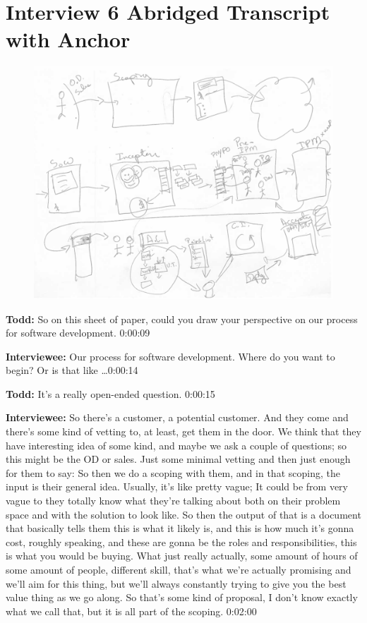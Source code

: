 \section{Interview 6 Abridged Transcript with Anchor }

\begin{figure}[h]
\centering
\includegraphics[width=6.5in]{interviews/drawings/2015_08_12_anchor.png}
\caption{}
\label{2015_08_12_anchor}
\end{figure}

\textbf{Todd:} So on this sheet of paper, could you draw your perspective on our process for software development. 0:00:09

\textbf{Interviewee:}  Our process for software development.  Where do you want to begin?  Or is that like \ldots 0:00:14

\textbf{Todd:} It's a really open-ended question.  0:00:15

\textbf{Interviewee:}  	So there's a customer, a potential customer.  And they come and there's some kind of vetting to, at least, get them in the door.  We think that they have interesting idea of some kind, and maybe we ask a couple of questions; so this might be the OD or sales.  Just some minimal vetting and then just enough for them to say:   So then we do a scoping with them, and in that scoping, the input is their general idea.  Usually, it's like pretty vague; It could be from very vague to they totally know what they're talking about both on their problem space and with the solution to look like.  So then the output of that is a document that basically tells them this is what it likely is, and this is how much it's gonna cost, roughly speaking, and these are gonna be the roles and responsibilities, this is what you would be buying.  What just really actually, some amount of hours of some amount of people, different skill, that's what we're actually promising and we'll aim for this thing, but we'll always constantly trying to give you the best value thing as we go along.  So that's some kind of proposal, I don't know exactly what we call that, but it is all part of the scoping.  0:02:00

